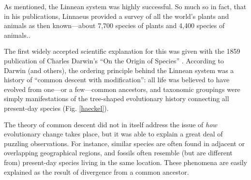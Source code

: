 \documentclass[11pt,a4paper]{book}
\begin{document}
As mentioned, the Linnean system was highly successful. So much so in fact, that in his publications, Linnaeus provided a survey of all the world's plants and animals as then known---about 7,700 species of plants and 4,400 species of animals..

The first widely accepted scientific explanation for this was given with the 1859 publication of Charles Darwin's ``On the Origin of Species'' .  According to Darwin (and others), the ordering principle behind the Linnean system was a history of ``common descent with modification'': all life was believed to have evolved from one---or a few---common ancestors, and taxonomic groupings were simply manifestations of the tree-shaped evolutionary history connecting all present-day species (Fig. \ref{haeckel}). 

The theory of common descent did not in itself address the issue of \emph{how} evolutionary change takes place, but it was able to explain a great deal of puzzling observations.  For instance, similar species are often found in adjacent or overlapping geographical regions, and fossils often resemble (but are different from) present-day species living in the same location. These phenomena are easily explained as the result of divergence from a common ancestor. 
\end{document}
